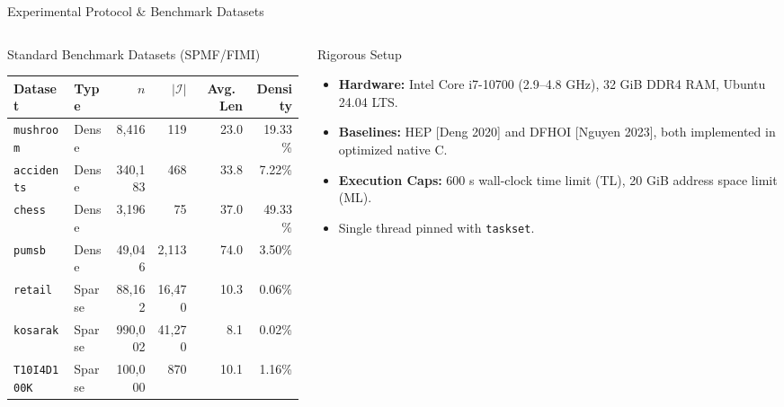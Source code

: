 \documentclass[aspectratio=169,10pt]{beamer}
\newcommand{\HEP}{\textsc{HEP}}
\newcommand{\DFHOI}{\textsc{DFHOI}}
\begin{document}
\begin{frame}{Experimental Protocol \& Benchmark Datasets}
  \begin{columns}[T]
    \begin{column}{0.52\textwidth}
      \begin{block}{Standard Benchmark Datasets (SPMF/FIMI)}
        \begin{table}
          \scriptsize
          \setlength{\tabcolsep}{2pt}
          \begin{tabular}{llrrrr}
            \toprule
            Dataset & Type & $n$ & $|\mathcal{I}|$ & Avg.\ Len & Density \\
            \midrule
            \texttt{mushroom} & Dense & 8,416 & 119 & 23.0 & 19.33\% \\
            \texttt{accidents} & Dense & 340,183 & 468 & 33.8 & 7.22\% \\
            \texttt{chess} & Dense & 3,196 & 75 & 37.0 & 49.33\% \\
            \texttt{pumsb} & Dense & 49,046 & 2,113 & 74.0 & 3.50\% \\
            \midrule
            \texttt{retail} & Sparse & 88,162 & 16,470 & 10.3 & 0.06\% \\
            \texttt{kosarak} & Sparse & 990,002 & 41,270 & 8.1 & 0.02\% \\
            \texttt{T10I4D100K} & Sparse & 100,000 & 870 & 10.1 & 1.16\% \\
            \bottomrule
          \end{tabular}
        \end{table}
      \end{block}
    \end{column}
    \begin{column}{0.45\textwidth}
      \begin{block}{Rigorous Setup}
        \begin{itemize}
          \item \textbf{Hardware:} Intel Core i7-10700 (2.9--4.8 GHz), 32 GiB DDR4 RAM, Ubuntu 24.04 LTS.
          \item \textbf{Baselines:} \HEP{} [Deng 2020] and \DFHOI{} [Nguyen 2023], both implemented in optimized native C.
          \item \textbf{Execution Caps:} 600 s wall-clock time limit (TL), 20 GiB address space limit (ML).
          \item Single thread pinned with \texttt{taskset}.
        \end{itemize}
      \end{block}
    \end{column}
  \end{columns}
\end{frame}
\end{document}

